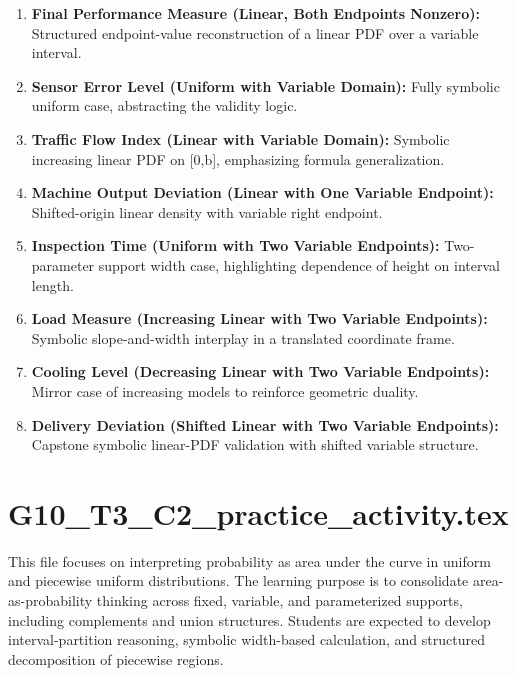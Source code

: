 \begin{enumerate}
  \item \textbf{Final Performance Measure (Linear, Both Endpoints Nonzero):} Structured endpoint-value reconstruction of a linear PDF over a variable interval.
  \item \textbf{Sensor Error Level (Uniform with Variable Domain):} Fully symbolic uniform case, abstracting the validity logic.
  \item \textbf{Traffic Flow Index (Linear with Variable Domain):} Symbolic increasing linear PDF on [0,b], emphasizing formula generalization.
  \item \textbf{Machine Output Deviation (Linear with One Variable Endpoint):} Shifted-origin linear density with variable right endpoint.
  \item \textbf{Inspection Time (Uniform with Two Variable Endpoints):} Two-parameter support width case, highlighting dependence of height on interval length.
  \item \textbf{Load Measure (Increasing Linear with Two Variable Endpoints):} Symbolic slope-and-width interplay in a translated coordinate frame.
  \item \textbf{Cooling Level (Decreasing Linear with Two Variable Endpoints):} Mirror case of increasing models to reinforce geometric duality.
  \item \textbf{Delivery Deviation (Shifted Linear with Two Variable Endpoints):} Capstone symbolic linear-PDF validation with shifted variable structure.
\end{enumerate}

\section{G10\_T3\_C2\_practice\_activity.tex}
This file focuses on interpreting probability as area under the curve in uniform and piecewise uniform distributions. The learning purpose is to consolidate area-as-probability thinking across fixed, variable, and parameterized supports, including complements and union structures. Students are expected to develop interval-partition reasoning, symbolic width-based calculation, and structured decomposition of piecewise regions.

